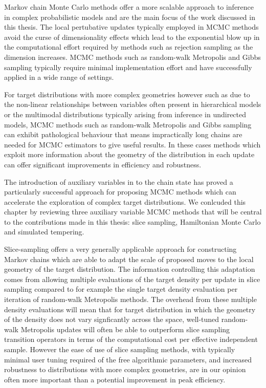 Markov chain Monte Carlo methods offer a more scalable approach to inference in complex probabilistic models and are the main focus of the work discussed in this thesis. The local pertubative updates typically employed in \ac{MCMC} methods avoid the curse of dimensionality effects which lead to the exponential blow up in the computational effort required by methods such as rejection sampling as the dimension increases. \ac{MCMC} methods such as random-walk Metropolis and Gibbs sampling typically require minimal implementation effort and have successfully applied in a wide range of settings. %

For target distributions with more complex geometries however such as due to the non-linear relationships between variables often present in hierarchical models or the multimodal distributions typically arising from inference in undirected models, \ac{MCMC} methods such as random-walk Metropolis and Gibbs sampling can exhibit pathological behaviour that means impractically long chains are needed for \ac{MCMC} estimators to give useful results. In these cases methods which exploit more information about the geometry of the distribution in each update can offer significant improvements in efficiency and robustness.

The introduction of auxiliary variables in to the chain state has proved a particularly successful approach for proposing \ac{MCMC} methods which can accelerate the exploration of complex target distributions. We conlcuded this chapter by reviewing three auxiliary variable \ac{MCMC} methods that will be central to the contributions made in this thesis: slice sampling, Hamiltonian Monte Carlo and simulated tempering. 

Slice-sampling offers a very generally applicable approach for constructing Markov chains which are able to adapt the scale of proposed moves to the local geometry of the target distribution. The information controlling this adaptation comes from allowing multiple evaluations of the target density per update in slice sampling compared to for example the single target density evaluation per iteration of random-walk Metropolis methods. The overhead from these multiple density evaluations will mean that for target distribution in which the geometry of the density does not vary signficantly across the space, well-tuned random-walk Metropolis updates will often be able to outperform slice sampling transition operators in terms of the computational cost per effective independent sample. However the ease of use of slice sampling methods, with typically minimal user tuning required of the free algorithmic parameters, and increased robustness to distributions with more complex geometries, are in our opinion often more important than a potential improvement in peak efficiency.

